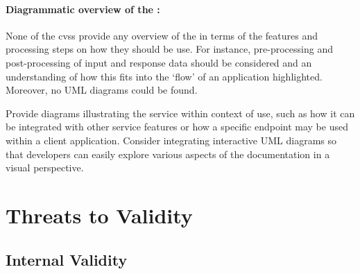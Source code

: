 \paragraph{Diagrammatic overview of the  :} None of the \glspl{cvs} provide any overview of the  in terms of the features and processing steps on how they should be use. For instance, pre-processing and post-processing of input and response data should be considered and an understanding of how this fits into the `flow' of an application highlighted. Moreover, no UML diagrams could be found.

\begin{leftbar}\SuggestedImprovement
Provide diagrams illustrating the service within context of use, such as how it can be integrated with other service features or how a specific  endpoint may be used within a client application. Consider integrating interactive UML diagrams so that developers can easily explore various aspects of the documentation in a visual perspective.
\end{leftbar}




 

\section{Threats to Validity}
\label{tse2020:sec:limitations}

\subsection{Internal Validity}

